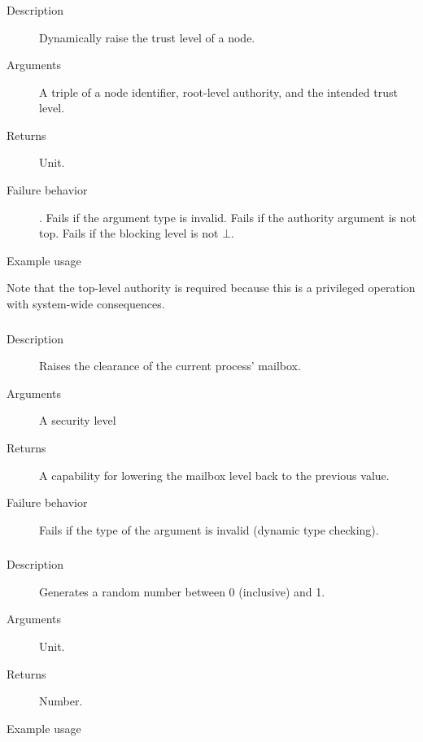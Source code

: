 \subsubsection{}
\begin{description}
    \item [Description] Dynamically raise the trust level of a node.
    \item [Arguments] A triple of a node identifier, root-level authority, and the intended trust level.
    \item [Returns] Unit.
    \item [Failure behavior]. Fails if the argument type is invalid. Fails if the authority argument is not top.
 Fails if the blocking level is not $\bot$.
    \item [Example usage] 
\end{description}
Note that the top-level authority is required because this is a privileged operation with system-wide consequences.


\subsubsection{}
\begin{description}
    \item [Description] Raises the clearance of the current process' mailbox.
    \item [Arguments] A security level
    \item [Returns] A capability for lowering the mailbox level back to the previous value.
    \item [Failure behavior] Fails if the type of the argument is invalid (dynamic type checking).
\end{description}


\subsubsection{}
\begin{description}
    \item [Description] Generates a random number between 0 (inclusive) and 1.
    \item [Arguments] Unit.
    \item [Returns] Number.
    \item [Example usage] 
\end{description}


